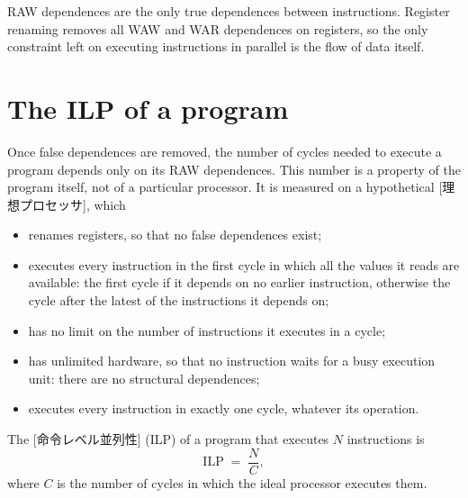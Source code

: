 \documentclass[../main.tex]{subfiles}
\begin{document}
\begin{keypoint}
  RAW dependences are the only true dependences between instructions.
  Register renaming removes all WAW and WAR dependences on registers, so the
  only
  constraint left on executing instructions in parallel is the flow of data
  itself.
\end{keypoint}

\section{The ILP of a program}
\label{sec:l06-ilp}

Once false dependences are removed, the number of cycles needed to execute a
program depends only on its RAW dependences.  This number is a property of the program
itself, not of a particular processor.  It is measured on a hypothetical
[理想プロセッサ], which
\begin{itemize}
  \item renames registers, so that no false dependences exist;
  \item executes every instruction in the first cycle in which all the
    values it reads are available: the first cycle if it depends on no
    earlier instruction, otherwise the cycle after the latest of the
    instructions it depends on;
  \item has no limit on the number of instructions it executes in a cycle;
  \item has unlimited hardware, so that no instruction waits for a busy
    execution unit: there are no structural dependences;
  \item executes every instruction in exactly one cycle, whatever its
    operation.
\end{itemize}

\begin{definition}
  \label{def:l06-ilp}
  The [命令レベル並列性]%
   (ILP) of a program that
  executes $N$ instructions is
  \begin{equation}
    \text{ILP} \;=\; \frac{N}{C} ,
    \label{eq:l06-ilp}
  \end{equation}
  where $C$ is the number of cycles in which the ideal processor executes
  them.
\end{definition}
\end{document}
